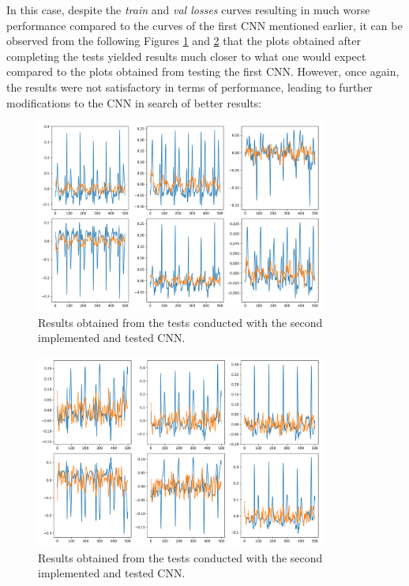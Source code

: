 \documentclass[12pt,italian]{report}
\begin{document}
In this case, despite the \textit{train} and \textit{val losses} curves resulting in much worse performance compared to the curves of the first CNN mentioned earlier, it can be observed from the following Figures \ref{fig:second_cnn_second_plot_0} and \ref{fig:second_cnn_second_plot_1} that the plots obtained after completing the tests yielded results much closer to what one would expect compared to the plots obtained from testing the first CNN. However, once again, the results were not satisfactory in terms of performance, leading to further modifications to the CNN in search of better results:

\begin{figure}[H]
    \centering
    \includegraphics[width=0.85\textwidth]{images/second_cnn_second_plot_0.png}
    \captionsetup{justification=centering}
    \caption{Results obtained from the tests conducted with the second implemented and tested CNN.}
    \label{fig:second_cnn_second_plot_0}
\end{figure}
\begin{figure}[H]
    \centering
    \includegraphics[width=0.85\textwidth]{images/second_cnn_second_plot_1.png}
    \captionsetup{justification=centering}
    \caption{Results obtained from the tests conducted with the second implemented and tested CNN.}
    \label{fig:second_cnn_second_plot_1}
\end{figure}
\end{document}
